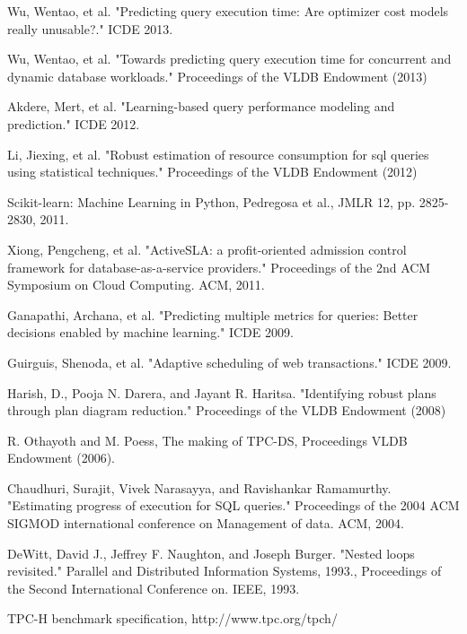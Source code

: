 \documentclass{article}
\begin{document}
\begin{multicols}{2}
	

	
	\begin{thebibliography}{9}
	Wu, Wentao, et al. "Predicting query execution time: Are optimizer cost models really unusable?." ICDE 2013.

	Wu, Wentao, et al. "Towards predicting query execution time for concurrent and dynamic database workloads." Proceedings of the VLDB Endowment (2013)


	Akdere, Mert, et al. "Learning-based query performance modeling and prediction." ICDE 2012.

	Li, Jiexing, et al. "Robust estimation of resource consumption for sql queries using statistical techniques." Proceedings of the VLDB Endowment (2012)
	

	Scikit-learn: Machine Learning in Python, Pedregosa et al., JMLR 12, pp. 2825-2830, 2011.


	Xiong, Pengcheng, et al. "ActiveSLA: a profit-oriented admission control framework for database-as-a-service providers." Proceedings of the 2nd ACM Symposium on Cloud Computing. ACM, 2011.	

	Ganapathi, Archana, et al. "Predicting multiple metrics for queries: Better decisions enabled by machine learning." ICDE 2009.
	
     
     Guirguis, Shenoda, et al. "Adaptive scheduling of web transactions." ICDE 2009.
	
	Harish, D., Pooja N. Darera, and Jayant R. Haritsa. "Identifying robust plans through plan diagram reduction." Proceedings of the VLDB Endowment (2008)
	
	R. Othayoth and M. Poess, The making of TPC-DS, Proceedings VLDB Endowment (2006).

	Chaudhuri, Surajit, Vivek Narasayya, and Ravishankar Ramamurthy. "Estimating progress of execution for SQL queries." Proceedings of the 2004 ACM SIGMOD international conference on Management of data. ACM, 2004.
	
	DeWitt, David J., Jeffrey F. Naughton, and Joseph Burger. "Nested loops revisited." Parallel and Distributed Information Systems, 1993., Proceedings of the Second International Conference on. IEEE, 1993.
	
	TPC-H benchmark specification, http://www.tpc.org/tpch/

	
	\end{thebibliography}
	\end{multicols}
\end{document}
